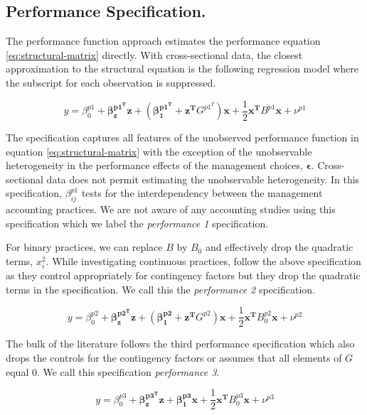 \documentclass[12pt]{article}
\begin{document}
\subsection{Performance Specification.}\label{the-performance-specification.}

The performance function approach estimates the performance equation \eqref{eq:structural-matrix} directly. With cross-sectional data, the closest approximation to the structural equation is the following regression model where the subscript for each observation is suppressed. 

\begin{equation*}
    y = \beta_0^{p1} + \mathbf{\beta_z^{p1^T} z} + (\mathbf{\beta_1^{p1^T}} + \mathbf{z^T} G^{p1^T}) \mathbf{x} + 
    \frac{1}{2}\mathbf{x^T} B^{p1} \mathbf{x} + \nu^{p1}
\end{equation*}

The specification captures all features of the unobserved performance function in equation \eqref{eq:structural-matrix} with the exception of the unobservable heterogeneity in the performance effects of the management choices, $\mathbf{\epsilon}$. Cross-sectional data does not permit estimating the unobservable heterogeneity. In this specification, \(\beta_{ij}^{p1}\) tests for the interdependency between the management accounting practices. We are not aware of any accounting studies using this specification which we label the \emph{performance 1} specification. 

For binary practices, we can replace $B$ by $B_0$ and effectively drop the quadratic terms, $x_i^2$.  While investigating continuous practices, \citet{Bedford2016} follow the above specification as they control appropriately for contingency factors but they drop the quadratic terms in the specification. We call this the \emph{performance 2} specification.

\begin{equation*}
    y = \beta_0^{p2} + \mathbf{\beta_z^{p2^T} z} + (\mathbf{\beta_1^{p2}} + \mathbf{z^T} G^{p2}) \mathbf{x} + 
    \frac{1}{2}\mathbf{x^T} B_0^{p2} \mathbf{x} + \nu^{p2}
\end{equation*}

The bulk of the literature follows the third performance specification which also drops the controls for the contingency factors or assumes that all elements of $G$ equal $0$. We call this specification \emph{performance 3}.

\begin{equation*}
    y = \beta_0^{p3} + \mathbf{\beta_z^{p3^T} z} + \mathbf{\beta_1^{p3}} \mathbf{x} + 
    \frac{1}{2}\mathbf{x^T} B_0^{p3} \mathbf{x} + \nu^{p3}
\end{equation*}
\end{document}
